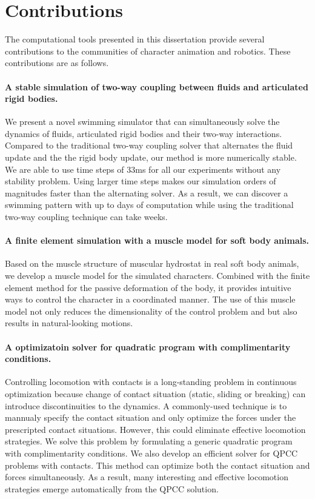 \section{Contributions}

The computational tools presented in this dissertation provide several contributions to the communities of character animation and robotics. These contributions are as follows.

\paragraph{A stable simulation of two-way coupling between fluids and articulated rigid bodies.} We present a novel swimming simulator that can simultaneously solve the dynamics of fluids, articulated rigid bodies and their two-way interactions. Compared to the traditional two-way coupling solver that alternates the fluid update and the the rigid body update, our method is more numerically stable. We are able to use time steps of 33ms for all our experiments without any stability problem. Using larger time steps makes our simulation orders of magnitudes faster than the alternating solver. As a result, we can discover a swimming pattern with up to days of computation while using the traditional two-way coupling technique can take weeks.

\paragraph{A finite element simulation with a muscle model for soft body animals.} Based on the muscle structure of muscular hydrostat \cite{} in real soft body animals, we develop a muscle model for the simulated characters. Combined with the finite element method for the passive deformation of the body, it provides intuitive ways to control the character in a coordinated manner. The use of this muscle model not only reduces the dimensionality of the control problem and but also results in natural-looking motions.

\paragraph{A optimizatoin solver for quadratic program with complimentarity conditions.} Controlling locomotion with contacts is a long-standing problem in continuous optimization because change of contact situation (static, sliding or breaking) can introduce discontinuities to the dynamics. A commonly-used technique is to mannualy specify the contact situation and only optimize the forces under the prescripted contact situations. However, this could eliminate effective locomotion strategies. We solve this problem by formulating a generic quadratic program with complimentarity conditions. We also develop an efficient solver for QPCC problems with contacts. This method can optimize both the contact situation and forces simultaneously. As a result, many interesting and effective locomotion strategies emerge automatically from the QPCC solution.

